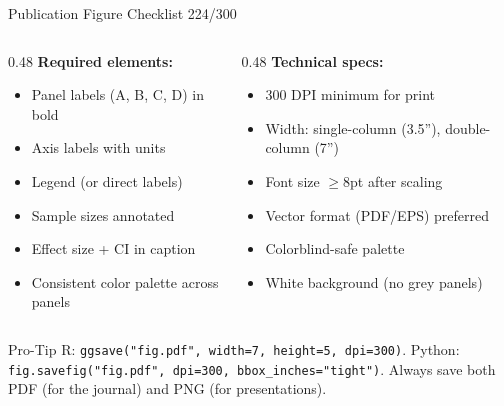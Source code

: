 \documentclass[10pt]{beamer}
\newcommand{\smark}[1]{\hfill{\scriptsize\color{codegray}#1}}
\begin{document}
\begin{frame}{Publication Figure Checklist}
\smark{224/300}
\begin{columns}[T]
\begin{column}{0.48\textwidth}
    \textbf{Required elements:}
    \begin{itemize}
        \item Panel labels (A, B, C, D) in bold
        \item Axis labels with units
        \item Legend (or direct labels)
        \item Sample sizes annotated
        \item Effect size + CI in caption
        \item Consistent color palette across panels
    \end{itemize}
\end{column}
\begin{column}{0.48\textwidth}
    \textbf{Technical specs:}
    \begin{itemize}
        \item 300 DPI minimum for print
        \item Width: single-column (3.5''), double-column (7'')
        \item Font size $\geq 8$pt after scaling
        \item Vector format (PDF/EPS) preferred
        \item Colorblind-safe palette
        \item White background (no grey panels)
    \end{itemize}
\end{column}
\end{columns}

\vspace{0.2cm}
\begin{alertblock}{Pro-Tip}
    \scriptsize R: \texttt{ggsave("fig.pdf", width=7, height=5, dpi=300)}. Python: \texttt{fig.savefig("fig.pdf", dpi=300, bbox\_inches="tight")}. Always save both PDF (for the journal) and PNG (for presentations).
\end{alertblock}
\end{frame}
\end{document}
